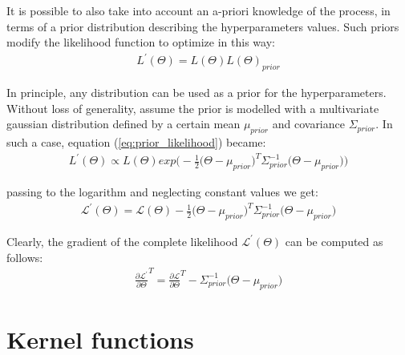 \documentclass{article}
\begin{document}
It is possible to also take into account an a-priori knowledge of the process, in terms of a prior distribution describing the hyperparameters values. Such priors modify the likelihood function to optimize in this way:
\begin{eqnarray}
L^{'}(\Theta) = L(\Theta) L(\Theta)_{prior} 
\label{eq:prior_likelihood}
\end{eqnarray}

In principle, any distribution can be used as a prior for the hyperparameters. Without loss of generality, assume the prior is modelled with a multivariate gaussian distribution defined by a certain mean $\mu_{prior}$ and covariance $\Sigma_{prior}$. 
In such a case, equation (\ref{eq:prior_likelihood}) became:
\begin{eqnarray}
L^{'}(\Theta) \propto L(\Theta) 
exp \bigg ( -\frac{1}{2} \big(\Theta - \mu_{prior}\big)^T \Sigma^{-1}_{prior} \big(\Theta - \mu_{prior}\big) \bigg )
\end{eqnarray}

passing to the logarithm and neglecting constant values we get:
\begin{eqnarray}
\mathcal{L}^{'}(\Theta) = \mathcal{L}(\Theta)
-\frac{1}{2} \big(\Theta - \mu_{prior}\big)^T \Sigma^{-1}_{prior} \big(\Theta - \mu_{prior}\big) 
\end{eqnarray}

Clearly, the gradient of the complete likelihood $\mathcal{L}^{'}(\Theta)$ can be computed as follows:
\begin{eqnarray}
\frac{\partial \mathcal{L}^{'}}{\partial \Theta}^T = 
\frac{\partial \mathcal{L}}{\partial \Theta}^T - \Sigma^{-1}_{prior} \big( \Theta - \mu_{prior} \big)
\end{eqnarray}

\section{Kernel functions}
\label{sec:kernel_function}
\end{document}

